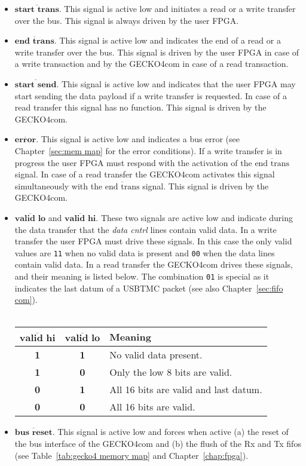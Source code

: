 \begin{itemize}
\item $\overline{\textbf{start trans}}$. This signal is active low and initiates
a read or a write transfer over the bus. This signal is always driven by the
user FPGA.
\item $\overline{\textbf{end trans}}$. This signal is active low and indicates
the end of a read or a write transfer over the bus. This signal is driven by the
user FPGA in case of a write transaction and by the {\sc GECKO4com} in case of a
read transaction.
\item $\overline{\textbf{start send}}$. This signal is active low and indicates
that the user FPGA may start sending the data payload if a write transfer is
requested. In case of a read transfer this signal has no function. This signal
is driven by the {\sc GECKO4com}.
\item $\overline{\textbf{error}}$. This signal is active low and indicates a bus
error (see Chapter~\ref{sec:mem map} for the error conditions). If a write
transfer is in progress the user FPGA must respond with the activation
of the $\overline{\text{end trans}}$ signal. In case of a read transfer the
{\sc GECKO4com} activates this signal simultaneously with the
$\overline{\text{end trans}}$ signal. This signal is driven by the {\sc
GECKO4com}.
\item $\overline{\textbf{valid lo}}$ and $\overline{\textbf{valid hi}}$. These
two signals are active low and indicate during the data transfer that the
\emph{data cntrl} lines contain valid data. In a write transfer the user FPGA
must drive these signals. In this case the only valid values are \verb+11+ when
no valid data is present and \verb+00+ when the data lines contain valid data.
In a read transfer the {\sc GECKO4com} drives these signals, and their meaning
is listed below. The combination \verb+01+ is special as it indicates the last
datum of a USBTMC packet (see also Chapter~\ref{sec:fifo com}).\\
 \\
\begin{tabular}{|c|c|l|}
\hline
$\overline{\textbf{valid hi}}$&
$\overline{\textbf{valid lo}}$&
\textbf{Meaning}\\
\hline
\hline
\textbf{1}&\textbf{1}&No valid data present.\\
\hline
\textbf{1}&\textbf{0}&Only the low 8 bits are valid.\\
\hline
\textbf{0}&\textbf{1}&All 16 bits are valid and last datum.\\
\hline
\textbf{0}&\textbf{0}&All 16 bits are valid.\\
\hline
\end{tabular}

\item $\overline{\textbf{bus reset}}$. This signal is active low and forces when
active (a) the reset of the bus interface of the {\sc GECKO4com} and (b) the
flush of the Rx and Tx fifos (see Table~\ref{tab:gecko4 memory map} and
Chapter~\ref{chap:fpga}).
\end{itemize}

